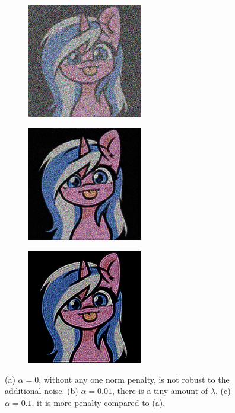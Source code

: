 \documentclass[]{article}
\theoremstyle{definition}
\begin{document}
        \begin{figure}[H]
            \centering
            \begin{subfigure}{0.31\textwidth}
                \includegraphics[width=5cm]{inverse_linear_experiment1-soln_img.jpg}
                \caption{} \label{fig:1a}
            \end{subfigure}     %
            \hspace*{\fill}     %
            \begin{subfigure}{0.31\textwidth}
                \includegraphics[width=5cm]{inverse_linear_experiment2-soln_img.jpg}
                \caption{} \label{fig:1b}
            \end{subfigure}     %
            \hspace*{\fill}     %
            \begin{subfigure}{0.31\textwidth}
                \includegraphics[width=5cm]{inverse_linear_experiment3-soln_img.jpg}
                \caption{} \label{fig:1c}
            \end{subfigure}
            \caption{(a) $\alpha = 0$, without any one norm penalty, is not robust to the additional noise. (b) $\alpha = 0.01$, there is a tiny amount of $\lambda$. (c) $\alpha = 0.1$, it is more penalty compared to (a).}
            \label{fig:alto_deblurred}
        \end{figure}
\end{document}
